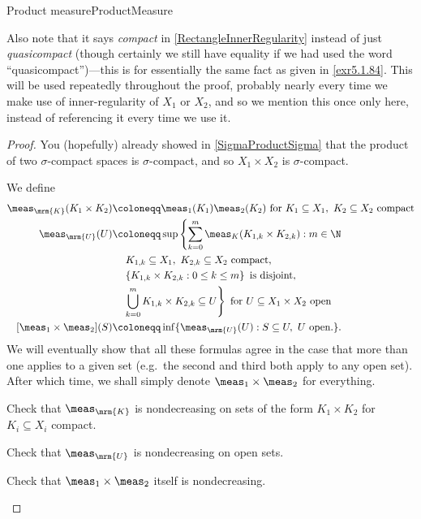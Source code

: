 \begin{thm}{Product measure}{ProductMeasure}
\begin{rmk}
\end{rmk}
\begin{rmk}
Also note that it says \emph{compact} in \eqref{RectangleInnerRegularity} instead of just \emph{quasicompact} (though certainly we still have equality if we had used the word ``quasicompact'')---this is for essentially the same fact as given in \cref{exr5.1.84}.  This will be used repeatedly throughout the proof, probably nearly every time we make use of inner-regularity of $X_1$ or $X_2$, and so we mention this once only here, instead of referencing it every time we use it.
\end{rmk}
\begin{proof}
You (hopefully) already showed in \cref{SigmaProductSigma} that the product of two $\sigma$-compact spaces is $\sigma$-compact, and so $X_1\times X_2$ is $\sigma$-compact.

We define
\begin{equation}\label{eqn5.2.3}
\begin{split}
\meas _{\mrm{K}}(K_1\times K_2) & \coloneqq \meas _1(K_1)\meas _2(K_2)\text{ for }K_1\subseteq X_1,\ K_2\subseteq X_2\text{ compact} \\
\meas _{\mrm{U}}(U) & \coloneqq \sup \left\{ \sum _{k=0}^m\meas _K(K_{1,k}\times K_{2,k}):m\in \N \right. \\
& \quad \left. K_{1,k}\subseteq X_1,\ K_{2,k}\subseteq X_2\text{ compact},\right. \\
& \quad \left. \left\{ K_{1,k}\times K_{2,k}:0\leq k\leq m\right\} \text{ is disjoint},\right. \\
& \quad \left. \bigcup _{k=0}^mK_{1,k}\times K_{2,k}\subseteq U\right\} \text{ for }U\subseteq X_1\times X_2\text{ open} \\
[\meas _1\times \meas _2](S) & \coloneqq \inf \{ \meas _{\mrm{U}}(U):S\subseteq U,\ U\text{ open.}\} .
\end{split}
\end{equation}
We will eventually show that all these formulas agree in the case that more than one applies to a given set (e.g.~the second and third both apply to any open set).  After which time, we shall simply denote $\meas _1\times \meas _2$ for everything.

\begin{exr}[breakable=false]{}{}
Check that $\meas _{\mrm{K}}$ is nondecreasing on sets of the form $K_1\times K_2$ for $K_i\subseteq X_i$ compact.
\end{exr}
\begin{exr}[breakable=false]{}{}
Check that $\meas _{\mrm{U}}$ is nondecreasing on open sets.
\end{exr}
\begin{exr}[breakable=false]{}{}
Check that $\meas _1\times \meas _2$ itself is nondecreasing.
\end{exr}


\end{proof}
\end{thm}
